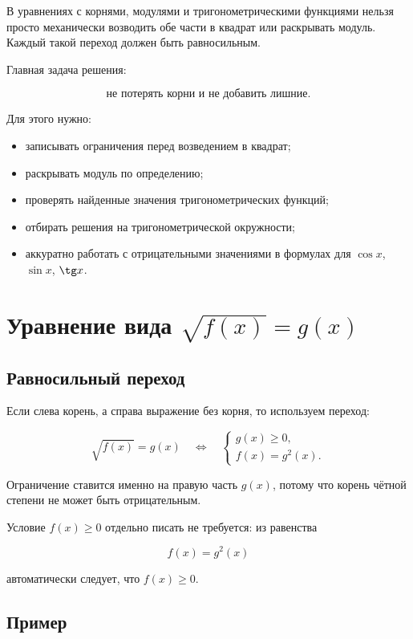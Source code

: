 \documentclass[a4paper,12pt]{article}
\begin{document}
В уравнениях с корнями, модулями и тригонометрическими функциями нельзя просто механически возводить обе части в квадрат или раскрывать модуль. Каждый такой переход должен быть равносильным.

Главная задача решения:

\[
\text{не потерять корни и не добавить лишние.}
\]

Для этого нужно:

\begin{itemize}
  \item записывать ограничения перед возведением в квадрат;
  \item раскрывать модуль по определению;
  \item проверять найденные значения тригонометрических функций;
  \item отбирать решения на тригонометрической окружности;
  \item аккуратно работать с отрицательными значениями в формулах для \(\cos x\), \(\sin x\), \(\tg x\).
\end{itemize}

\section{Уравнение вида \(\sqrt{f(x)}=g(x)\)}

\subsection{Равносильный переход}

Если слева корень, а справа выражение без корня, то используем переход:

\[
\sqrt{f(x)}=g(x)
\quad\Longleftrightarrow\quad
\begin{cases}
g(x)\ge 0,\\
f(x)=g^2(x).
\end{cases}
\]

Ограничение ставится именно на правую часть \(g(x)\), потому что корень чётной степени не может быть отрицательным.

Условие \(f(x)\ge0\) отдельно писать не требуется: из равенства

\[
f(x)=g^2(x)
\]

автоматически следует, что \(f(x)\ge0\).

\subsection{Пример}
\end{document}
